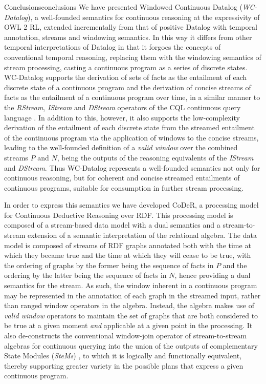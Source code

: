 \begin{nestedsection}{Conclusions}{conclusions}
	We have presented Windowed Continuous Datalog (\emph{WC-Datalog}), a well-founded semantics for continuous reasoning at the expressivity of OWL 2 RL, extended incrementally from that of positive Datalog with temporal annotation, streams and windowing semantics.
	In this way it differs from other temporal interpretations of Datalog \citep{TODO} in that it forgoes the concepts of conventional temporal reasoning, replacing them with the windowing semantics of stream processing, casting a continuous program as a series of discrete states.
	WC-Datalog supports the derivation of sets of facts as the entailment of each discrete state of a continuous program and the derivation of concise streams of facts as the entailment of a continuous program over time, in a similar manner to the \emph{RStream}, \emph{IStream} and \emph{DStream} operators of the CQL continuous query language \citep{CQL}.
	In addition to this, however, it also supports the low-complexity derivation of the entailment of each discrete state from the streamed entailment of the continuous program via the application of windows to the concise streams, leading to the well-founded definition of a \emph{valid window} over the combined streams $P$ and $N$, being the outputs of the reasoning equivalents of the \emph{IStream} and \emph{DStream}.
	Thus WC-Datalog represents a well-founded semantics not only for continuous reasoning, but for coherent and concise streamed entailments of continuous programs, suitable for consumption in further stream processing.

	In order to express this semantics we have developed CoDeR, a processing model for Continuous Deductive Reasoning over RDF.
	This processing model is composed of a stream-based data model with a dual semantics and a stream-to-stream extension of a semantic interpretation of the relational algebra.
	The data model is composed of streams of RDF graphs annotated both with the time at which they became true and the time at which they will cease to be true, with the ordering of graphs by the former being the sequence of facts in $P$ and the ordering by the latter being the sequence of facts in $N$, hence providing a dual semantics for the stream.
	As such, the window inherent in a continuous program may be represented in the annotation of each graph in the streamed input, rather than ranged window operators in the algebra.
	Instead, the algebra makes use of \emph{valid window} operators to maintain the set of graphs that are both considered to be true at a given moment \emph{and} applicable at a given point in the processing.
	It also de-constructs the conventional window-join operator of stream-to-stream algebras for continuous querying into the union of the outputs of complementary State Modules (\emph{SteMs}) \citep{SteMs}, to which it is logically and functionally equivalent, thereby supporting greater variety in the possible plans that express a given continuous program.


\end{nestedsection}
